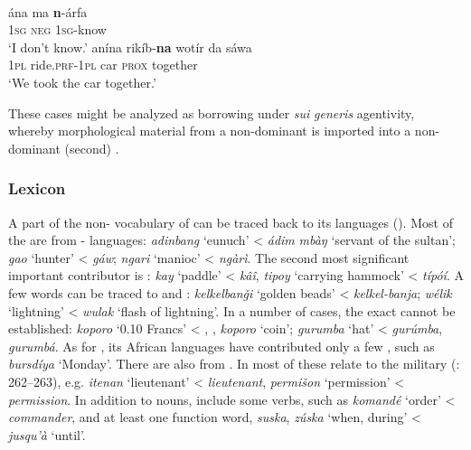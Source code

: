 \documentclass[output=paper]{langsci/langscibook}
\begin{document}
\ea
{  \citep[181]{Luffin2013}}\\
\ea
\gll ána ma \textbf{n}-árfa \\
         1\textsc{sg} \textsc{neg} 1\textsc{sg}-know\\
\glt    `I don’t know.'
\ex
\gll  anína rikíb-\textbf{na} wotír da sáwa \\
         1\textsc{pl} ride.\textsc{prf}-1\textsc{pl} car \textsc{prox} together\\
\glt    `We took the car together.’
\z
\z
 
{These cases might be analyzed as borrowing under \textit{sui} \textit{generis}  agentivity, whereby morphological material from a non-dominant  is imported into a non-dominant (second) .}


 \subsubsection{Lexicon}

A part of the non- vocabulary of  can be traced back to its  languages (\citealt{Avram2019}). Most of the  are from - languages: \textit{adinbang} ‘eunuch’ <  \textit{ádim} \textit{mbàŋ} ‘servant of the sultan’; \textit{gao} ‘hunter’ <  \textit{gáw}; \textit{ngari} ‘manioc’ <  \textit{ngàrì}. The second most significant important contributor is : \textit{kay} ‘paddle’ <  \textit{kâî}, \textit{tipoy} ‘carrying hammock’ < \textit{típóí}. A few words can be traced to  and : \textit{kelkelbanǧi} ‘golden beads’ <  \textit{kelkel-banja}; \textit{wélik} ‘lightning’ <  \textit{wulak} ‘flash of lightning’. In a number of cases, the exact  cannot be established: \textit{koporo} ‘0.10 Francs’ < , ,  \textit{koporo} ‘coin’; \textit{gurumba} ‘hat’ <  \textit{gurúmba},  \textit{gurumbá}. As for  , its African  languages have contributed only a few , such as \textit{bursdíya} ‘Monday’. There are also  from . In  most of these relate to the military (\citealt{ToscoOwens1993}: 262–263), e.g.  \textit{itenan} ‘lieutenant’ <  \textit{lieutenant}, \textit{permišon} ‘permission’ <  \textit{permission}. In addition to nouns,   include some verbs, such as   \textit{komandé} ‘order’ <  \textit{commander}, and at least one function word,  \textit{suska},   \textit{zúska} ‘when, during’ <  \textit{jusqu’à} ‘until’.
\end{document}
